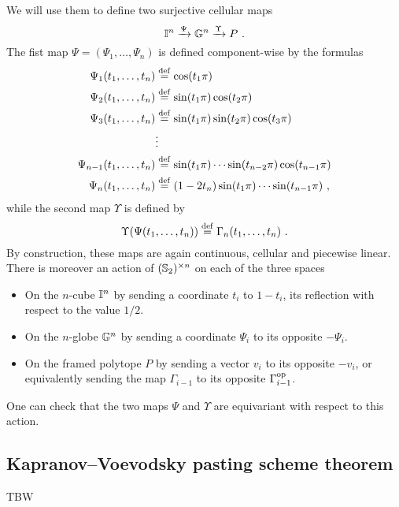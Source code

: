 We will use them to define two surjective cellular maps
\[
	\gcube^n \xra{\Psi} \globe^n \xra{\Upsilon} P \ .
\]
The fist map $\Psi=(\Psi_1,\ldots,\Psi_n)$ is defined component-wise by the formulas
\begin{align*}
	\Psi_1(t_1,\ldots,t_n) & \stackrel{\mathrm{def}}{=} \cos(t_1 \pi) \\
	\Psi_2(t_1,\ldots,t_n) & \stackrel{\mathrm{def}}{=} \sin(t_1 \pi)\cos(t_2\pi) \\
	\Psi_3(t_1,\ldots,t_n) & \stackrel{\mathrm{def}}{=} \sin(t_1 \pi)\sin(t_2\pi)\cos(t_3\pi) \\
	 & \vdots \\
	\Psi_{n-1}(t_1,\ldots,t_n) & \stackrel{\mathrm{def}}{=} \sin(t_1 \pi) \cdots \sin(t_{n-2} \pi) \cos(t_{n-1} \pi) \\
	\Psi_n(t_1,\ldots,t_n) & \stackrel{\mathrm{def}}{=} (1-2t_n) \sin(t_1 \pi) \cdots \sin(t_{n-1} \pi) \ ,
\end{align*}
while the second map $\Upsilon$ is defined by
\[
\Upsilon(\Psi(t_1,\ldots,t_n)) \stackrel{\mathrm{def}}{=} \Gamma_n(t_1,\ldots, t_n)\ .
\]
By construction, these maps are again continuous, cellular and piecewise linear.
There is moreover an action of $(\mathbb{S}_2)^{\times n}$ on each of the three spaces
\begin{itemize}
	\item On the $n$-cube $\mathbb{I}^n$ by sending a coordinate $t_i$ to $1-t_i$, its reflection with respect to the value $1/2$.
	\item On the $n$-globe $\mathbb{G}^n$ by sending a coordinate $\Psi_i$ to its opposite $-\Psi_i$.
	\item On the framed polytope $P$ by sending a vector $v_i$ to its opposite $-v_i$, or equivalently sending the map $\Gamma_{i-1}$ to its opposite $\Gamma_{i-1}^{\mathrm{op}}$.
\end{itemize}
One can check that the two maps $\Psi$ and $\Upsilon$ are equivariant with respect to this action.

\subsection{Kapranov--Voevodsky pasting scheme theorem}

TBW